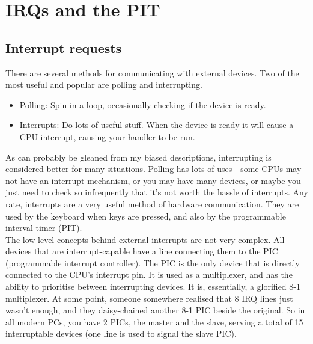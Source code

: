 \documentclass[12pt]{article}
\begin{document}
\section{IRQs and the PIT}
\subsection{Interrupt requests}
There are several methods for communicating with external devices. Two of the most useful and popular are polling and interrupting.
\begin{itemize}
  \item Polling: Spin in a loop, occasionally checking if the device is ready.
  \item Interrupts: Do lots of useful stuff. When the device is ready it will cause a CPU interrupt, causing your handler to be run.
\end{itemize}
As can probably be gleaned from my biased descriptions, interrupting is considered better for many situations. Polling has lots of uses - some CPUs may not have an interrupt mechanism, or you may have many devices, or maybe you just need to check so infrequently that it's not worth the hassle of interrupts. Any rate, interrupts are a very useful method of hardware communication. They are used by the keyboard when keys are pressed, and also by the programmable interval timer (PIT).\\
The low-level concepts behind external interrupts are not very complex. All devices that are interrupt-capable have a line connecting them to the PIC (programmable interrupt controller). The PIC is the only device that is directly connected to the CPU's interrupt pin. It is used as a multiplexer, and has the ability to prioritise between interrupting devices. It is, essentially, a glorified 8-1 multiplexer. At some point, someone somewhere realised that 8 IRQ lines just wasn't enough, and they daisy-chained another 8-1 PIC beside the original. So in all modern PCs, you have 2 PICs, the master and the slave, serving a total of 15 interruptable devices (one line is used to signal the slave PIC).
\end{document}
